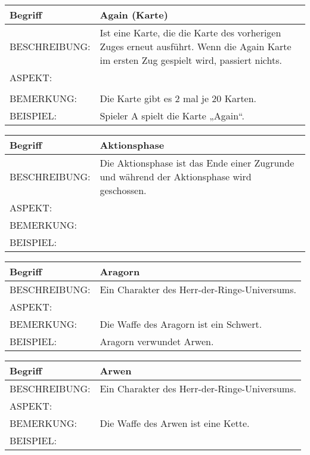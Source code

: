 \documentclass{uulm-assignment}
\begin{document}
	     \begin{tabularx}{\textwidth}{|l|X |} \hline
	        \textbf{Begriff} & \textbf{Again (Karte)} \\
	        \hline
	        BESCHREIBUNG: & Ist eine Karte, die die Karte des vorherigen Zuges erneut ausführt. Wenn die Again Karte im ersten Zug gespielt wird, passiert nichts. \\
	        \hline
	        ASPEKT: & \\
	        \\
	        \hline
	        BEMERKUNG: & Die Karte gibt es 2 mal je 20 Karten.\\
	        \hline
	        BEISPIEL: & Spieler A spielt die Karte „Again“. \\
	        \hline
	    \end{tabularx}

	     \begin{tabularx}{\textwidth}{|l|X |} \hline
	        \textbf{Begriff} & \textbf{Aktionsphase} \\
	        \hline
	        BESCHREIBUNG: & Die Aktionsphase ist das Ende einer Zugrunde und während der Aktionsphase wird geschossen. \\
	        \hline
	        ASPEKT: &
	        \\
	        \hline
	        BEMERKUNG: & \\
	        \hline
	        BEISPIEL: & \\
	        \hline
	    \end{tabularx}

	     \begin{tabularx}{\textwidth}{|l|X |} \hline
	        \textbf{Begriff} & \textbf{Aragorn} \\
	        \hline
	        BESCHREIBUNG: & Ein Charakter des Herr-der-Ringe-Universums. \\
	        \hline
	        ASPEKT: &
	        \\
	        \hline
	        BEMERKUNG: & Die Waffe des Aragorn ist ein Schwert.\\
	        \hline
	        BEISPIEL: & Aragorn verwundet Arwen. \\
	        \hline
	    \end{tabularx}

	     \begin{tabularx}{\textwidth}{|l|X |} \hline
	        \textbf{Begriff} & \textbf{Arwen} \\
	        \hline
	        BESCHREIBUNG: & Ein Charakter des Herr-der-Ringe-Universums. \\
	        \hline
	        ASPEKT: &
	        \\
	        \hline
	        BEMERKUNG: & Die Waffe des Arwen ist eine Kette. \\
	        \hline
	        BEISPIEL: & \\
	        \hline
	    \end{tabularx}
\end{document}
